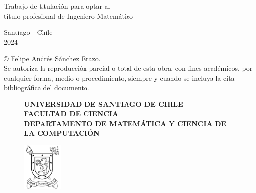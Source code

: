 \begin{titlepage}
\begin{center}
\vspace{2cm}

\hspace{0.45\linewidth}
\begin{minipage}[b]{0.45\linewidth}
\begin{flushleft}
Trabajo de titulación para optar
al \\
título profesional de Ingeniero Matemático
\end{flushleft}
\end{minipage}

\vspace{1.5cm}

\begin{center}
Santiago - Chile \\
2024
\end{center}

\end{center}
\end{titlepage}
  © Felipe Andrés Sánchez Erazo. \\
Se  autoriza  la  reproducción  parcial  o  total  de  esta  obra,  con  fines 
académicos,  por  cualquier  forma,  medio  o  procedimiento,  siempre  y 
cuando se incluya la cita bibliográfica del documento. 

\newpage


%
%

\begin{figure}[ht]
\hspace{0.1\linewidth}
\begin{minipage}[b]{0.75\linewidth}
\begin{center}
\textbf{\Large{UNIVERSIDAD DE SANTIAGO DE CHILE}}\\
\textbf{FACULTAD DE CIENCIA}\\
\textbf{DEPARTAMENTO DE MATEMÁTICA Y CIENCIA DE LA COMPUTACIÓN}
\end{center}	
\end{minipage}
\begin{minipage}[b]{0.1\linewidth}
\centering
\includegraphics[width=2cm]{./Imágenes/logo5}
\end{minipage}
\end{figure}

